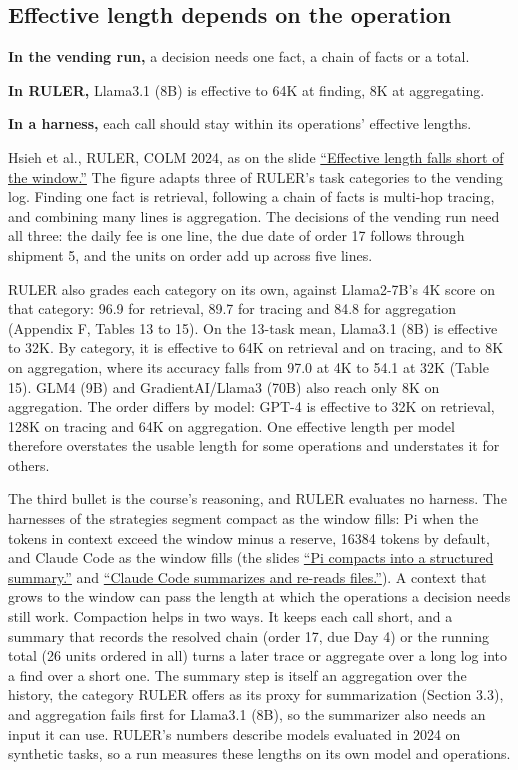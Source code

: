 \subsection{Effective length depends on the operation}
\label{sec:it-B-6-3}

\bi
\item \textbf{In the vending run,} a decision needs one fact, a chain of facts or a total.
\item \textbf{In RULER,} Llama3.1 (8B) is effective to 64K at finding, 8K at aggregating.
\item \textbf{In a harness,} each call should stay within its operations' effective lengths.
\ei

Hsieh et al., RULER, COLM 2024, as on the slide \hyperref[sec:it-B-6-2]{``Effective length falls short of the window.''} The figure adapts three of RULER's task categories to the vending log. Finding one fact is retrieval, following a chain of facts is multi-hop tracing, and combining many lines is aggregation. The decisions of the vending run need all three: the daily fee is one line, the due date of order 17 follows through shipment 5, and the units on order add up across five lines.

RULER also grades each category on its own, against Llama2-7B's 4K score on that category: 96.9 for retrieval, 89.7 for tracing and 84.8 for aggregation (Appendix F, Tables 13 to 15). On the 13-task mean, Llama3.1 (8B) is effective to 32K. By category, it is effective to 64K on retrieval and on tracing, and to 8K on aggregation, where its accuracy falls from 97.0 at 4K to 54.1 at 32K (Table 15). GLM4 (9B) and GradientAI/Llama3 (70B) also reach only 8K on aggregation. The order differs by model: GPT-4 is effective to 32K on retrieval, 128K on tracing and 64K on aggregation. One effective length per model therefore overstates the usable length for some operations and understates it for others.

The third bullet is the course's reasoning, and RULER evaluates no harness. The harnesses of the strategies segment compact as the window fills: Pi when the tokens in context exceed the window minus a reserve, 16384 tokens by default, and Claude Code as the window fills (the slides \hyperref[sec:it-7-5a]{``Pi compacts into a structured summary.''} and \hyperref[sec:it-7-5b]{``Claude Code summarizes and re-reads files.''}). A context that grows to the window can pass the length at which the operations a decision needs still work. Compaction helps in two ways. It keeps each call short, and a summary that records the resolved chain (order 17, due Day 4) or the running total (26 units ordered in all) turns a later trace or aggregate over a long log into a find over a short one. The summary step is itself an aggregation over the history, the category RULER offers as its proxy for summarization (Section 3.3), and aggregation fails first for Llama3.1 (8B), so the summarizer also needs an input it can use. RULER's numbers describe models evaluated in 2024 on synthetic tasks, so a run measures these lengths on its own model and operations.

